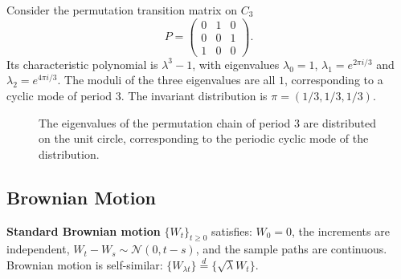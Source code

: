 \begin{example}\label{ch14_markov_cycle_example}
Consider the permutation transition matrix on $C_3$
\[
P = \begin{pmatrix} 0 & 1 & 0 \\ 0 & 0 & 1 \\ 1 & 0 & 0 \end{pmatrix}.
\]
Its characteristic polynomial is $\lambda^3 - 1$, with eigenvalues $\lambda_0 = 1$, $\lambda_1 = e^{2\pi i/3}$ and $\lambda_2 = e^{4\pi i/3}$. The moduli of the three eigenvalues are all $1$, corresponding to a cyclic mode of period $3$. The invariant distribution is $\pi = (1/3, 1/3, 1/3)$.
\end{example}

\begin{figure}[htbp]
\centering
{}
\caption{The eigenvalues of the permutation chain of period $3$ are distributed on the unit circle, corresponding to the periodic cyclic mode of the distribution.}
\label{fig:markov_cycle}
\end{figure}

\subsection{Brownian Motion}

\begin{definition}\label{def:brownian_motion}
\textbf{Standard Brownian motion} $\{W_t\}_{t \ge 0}$ satisfies: $W_0 = 0$, the increments are independent, $W_t - W_s \sim \mathcal{N}(0, t-s)$, and the sample paths are continuous. Brownian motion is self-similar: $\{W_{\lambda t}\} \stackrel{d}{=} \{\sqrt{\lambda} W_t\}$.
\end{definition}

